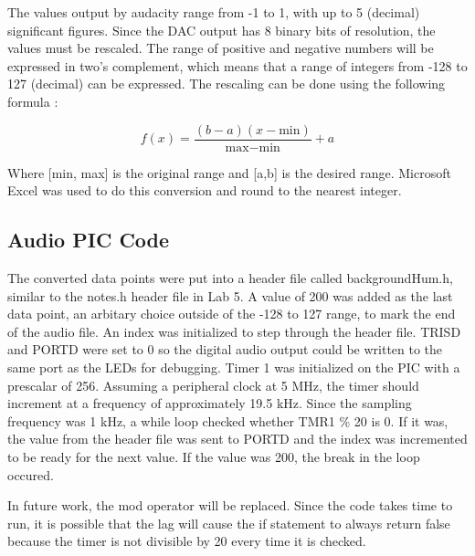 \documentclass[11pt]{article}
\begin{document}
The values output by audacity range from -1 to 1, with up to 5 (decimal) significant figures.  Since the DAC output has 8 binary bits of resolution, the values must be rescaled.  The range of positive and negative numbers will be expressed in two's complement, which means that a range of integers from -128 to 127 (decimal) can be expressed.  The rescaling can be done using the following formula \cite{scalingFormula}:

$$f(x) = \frac{(b-a)(x-\text{min})}{\text{max}-\text{min}} + a$$

Where [min, max] is the original range and [a,b] is the desired range.  Microsoft Excel was used to do this conversion and round to the nearest integer.


\subsection{Audio PIC Code}

The converted data points were put into a header file called backgroundHum.h, similar to the notes.h header file in Lab 5.  A value of 200 was added as the last data point, an arbitary choice outside of the -128 to 127 range, to mark the end of the audio file.  An index was initialized to step through the header file.  TRISD and PORTD were set to 0 so the digital audio output could be written to the same port as the LEDs for debugging.  Timer 1 was initialized on the PIC with a prescalar of 256. Assuming a peripheral clock at 5 MHz, the timer should increment at a frequency of approximately 19.5 kHz.  Since the sampling frequency was 1 kHz, a while loop checked whether TMR1 \% 20 is 0.  If it was, the value from the header file was sent to PORTD and the index was incremented to be ready for the next value. If the value was 200, the break in the loop occured. 

In future work, the mod operator will be replaced. Since the code takes time to run, it is possible that the lag will cause the if statement to always return false because the timer is not divisible by 20 every time it is checked.
\end{document}
